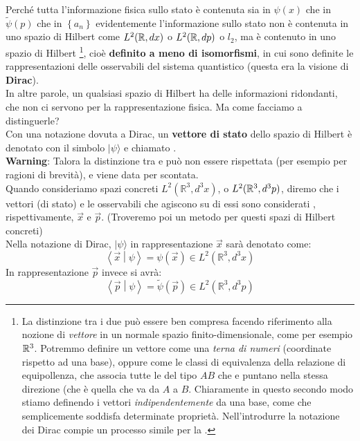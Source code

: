 \documentclass[FisicaTeorica.tex]{subfiles}
\begin{document}
Perché tutta l'informazione fisica sullo stato è contenuta sia in $\psi(x)$ che in $\tilde{\psi}(p)$ che in $\left\{a_n\right\}$ evidentemente l'informazione sullo stato non è contenuta in uno spazio di Hilbert  come $L^2(\mathbb{R},dx)$ o $L^2(\mathbb{R},dp)$ o $l_2$, ma è contenuto in uno spazio di Hilbert \footnote{La distinzione tra i due può essere ben compresa facendo riferimento alla nozione di \textit{vettore} in un normale spazio finito-dimensionale, come per esempio $\mathbb{R}^3$. Potremmo definire un vettore come una \textit{terna di numeri} (coordinate rispetto ad una base), oppure come le classi di equivalenza della relazione di equipollenza, che associa tutte le  del tipo $AB$ che  e puntano nella stessa direzione (che è quella che va da $A$ a $B$. Chiaramente in questo secondo modo stiamo definendo i vettori \textit{indipendentemente} da una base, come  che semplicemente soddisfa determinate proprietà. Nell'introdurre la notazione dei  Dirac compie un processo simile per la \MQ.}, cioè \textbf{definito a meno di isomorfismi}, in cui sono definite le rappresentazioni delle osservabili del sistema quantistico (questa era la visione di \textbf{Dirac}).\\
In altre parole, un qualsiasi spazio di Hilbert  ha delle informazioni ridondanti, che non ci servono per la rappresentazione fisica. Ma come facciamo a distinguerle?\\

Con una notazione dovuta a Dirac, un \textbf{vettore di stato} dello spazio di Hilbert  è denotato con il simbolo $|\psi\rangle$  e chiamato .\\ 
\textbf{Warning}: Talora la distinzione tra  e  può non essere rispettata (per esempio per ragioni di brevità), e viene data per scontata.\\
Quando consideriamo spazi concreti $L^2(\mathbb{R}^3,d^3x)$, o $L^2(\mathbb{R}^3,d^3p)$, diremo che i vettori (di stato) e le osservabili che agiscono su di essi sono considerati , rispettivamente, $\vec{x}$ e $\vec{p}$. (Troveremo poi un metodo per  questi spazi di Hilbert concreti)\\
Nella notazione di Dirac, $|\psi\rangle$ in rappresentazione $\vec{x}$ sarà denotato come:
\[
\left\langle\vec{x}\middle|\psi\right\rangle=\psi \left(\vec{x}\right)\in L^2(\mathbb{R}^3,d^3x)
\]
In rappresentazione $\vec{p}$ invece si avrà:
\[
\left\langle\vec{p}\middle|\psi\right\rangle=\tilde{\psi}\left(\vec{p}\right)\in L^2(\mathbb{R}^3,d^3p)
\]
\end{document}

